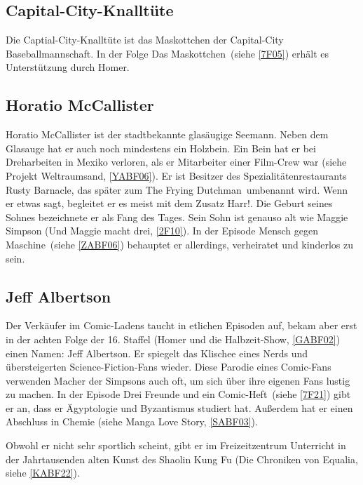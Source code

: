 \subsection{Capital-City-Knalltüte}
Die Captial-City-Knalltüte ist das Maskottchen der Capital-City Baseballmannschaft. In der Folge \glqq Das Maskottchen\grqq\ (siehe \ref{7F05}) erhält es Unterstützung durch Homer.


\subsection{Horatio McCallister}\label{HoratioMcCallister}
Horatio McCallister ist der stadtbekannte glasäugige Seemann. Neben dem Glasauge hat er auch noch mindestens ein Holzbein. Ein Bein hat er bei Dreharbeiten in Mexiko verloren, als er Mitarbeiter einer Film-Crew war (siehe \glqq Projekt Weltraumsand\grqq, \ref{YABF06}). Er ist Besitzer des Spezialitätenrestaurants \glqq Rusty Barnacle\grqq , das später zum \glqq The Frying Dutchman\grqq\ umbenannt wird. Wenn er etwas sagt, begleitet er es meist mit dem Zusatz \glqq Harr!\grqq . Die Geburt seines Sohnes bezeichnete er als \glqq Fang des Tages\grqq . Sein Sohn ist genauso alt wie Maggie Simpson (\glqq Und Maggie macht drei\grqq , \ref{2F10}). In der Episode \glqq Mensch gegen Maschine\grqq\ (siehe \ref{ZABF06}) behauptet er allerdings, verheiratet und kinderlos zu sein.


\subsection{Jeff Albertson}\label{JeffAlbertson}
Der Verkäufer im Comic-Ladens taucht in etlichen Episoden auf, bekam aber erst in der achten Folge der 16. Staffel (\glqq Homer und die Halbzeit-Show\grqq , \ref{GABF02}) einen Namen: Jeff Albertson. Er spiegelt das Klischee eines Nerds und über\-stei\-ger\-ten Science-Fiction-Fans wieder. Diese Parodie eines Comic-Fans verwenden Macher der Simpsons auch oft, um sich über ihre eigenen Fans lustig zu machen. In der Episode \glqq Drei Freunde und ein Comic-Heft\grqq\ (siehe \ref{7F21}) gibt er an, dass er Ägyptologie und Byzantismus studiert hat. Außerdem hat er einen Abschluss in Chemie (siehe \glqq Manga Love Story\grqq , \ref{SABF03}).

Obwohl er nicht sehr sportlich scheint, gibt er im Freizeitzentrum Unterricht in der Jahrtausenden alten Kunst des Shaolin Kung Fu (\glqq Die Chroniken von Equalia\grqq , siehe \ref{KABF22}).

